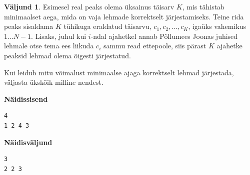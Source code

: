 \documentclass{trkut}
\theoremstyle{definition}
\newtheorem*{Output}{Väljund}
\begin{document}
\begin{Output}
Esimesel real peaks olema üksainus täisarv $K$, mis tähistab minimaalset aega, mida on vaja lehmade korrektselt järjestamiseks.
Teine rida peaks sisaldama $K$ tühikuga eraldatud täisarvu, $c_1,c_2,…,c_K$, igaüks vahemikus $1…N−1$. Lisaks, juhul kui $i$-ndal ajahetkel annab Põllumees Joonas juhised lehmale otse tema ees liikuda $c_i$ sammu read ettepoole, siis pärast $K$ ajahetke peaksid lehmad olema õigesti järjestatud.

Kui leidub mitu võimalust minimaalse ajaga korrektselt lehmad järjestada, väljasta ükskõik milline nendest.
\end{Output}



\textbf{Näidissisend}

\begin{verbatim}
4
1 2 4 3
\end{verbatim}

\textbf{Näidisväljund}

\begin{verbatim}
3
2 2 3
\end{verbatim}
\end{document}

